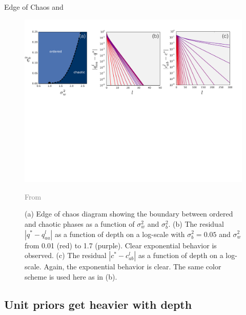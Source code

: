 \documentclass[9pt]{beamer}
\begin{document}
\begin{frame}[allowframebreaks]{Edge of Chaos}
\citet{poole2016exponential} and  \citet{schoenholz2016deep} \begin{figure}[h]
\begin{center}
\includegraphics[width=\linewidth]{figures_julyan/bdl/figure_1}
\caption{(a) Edge of chaos diagram showing the boundary between ordered and chaotic phases as a function of $\sigma_w^2$ and $\sigma_b^2$. (b) The residual $|q^* - q_{aa}^l|$ as a function of depth on a log-scale with $\sigma_b^2 = 0.05$ and $\sigma_w^2$ from 0.01 (red) to 1.7 (purple). Clear exponential behavior is observed. (c) The residual $|c^* - c_{ab}^l|$ as a function of depth on a log-scale. Again, the exponential behavior is clear. The same color scheme is used here as in (b).  \label{fig:phase_diagram}}
\end{center}
\hfill\textcolor{gray}{From \citet{schoenholz2016deep}}
\end{figure}


\end{frame}


\subsection{Unit priors get heavier with depth}
\end{document}
